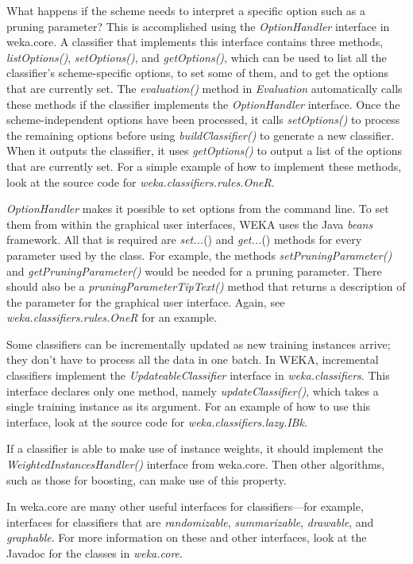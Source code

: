 What happens if the scheme needs to interpret a specific option such
as a pruning parameter? This is accomplished using
the \textit{OptionHandler} interface in weka.core. A classifier that
implements this interface contains three
methods, \textit{listOptions()}, \textit{setOptions()},
and \textit{getOptions()}, which can be used to list all the
classifier's scheme-specific options, to set some of them, and to get
the options that are currently set. The \textit{evaluation()} method
in \textit{Evaluation} automatically calls these methods if the
classifier implements the \textit{OptionHandler} interface. Once the
scheme-independent options have been processed, it
calls \textit{setOptions()} to process the remaining options before
using \textit{buildClassifier()} to generate a new classifier. When it
outputs the classifier, it uses \textit{getOptions()} to output a list
of the options that are currently set. For a simple example of how to
implement these methods, look at the source code for
\textit{weka.classifiers.rules.OneR}.

\textit{OptionHandler} makes it possible to set options from the command
line. To set them from within the graphical user interfaces, WEKA uses
the Java \textit{beans} framework. All that is required are \textit{set...}() and
\textit{get...}() methods for every parameter used by the class. For example,
the methods \textit{setPruningParameter()} and \textit{getPruningParameter()} would be
needed for a pruning parameter. There should also be a
\textit{pruningParameterTipText()} method that returns a description of the
parameter for the graphical user interface. Again, see
\textit{weka.classifiers.rules.OneR} for an example.

Some classifiers can be incrementally updated as new training
instances arrive; they don't have to process all the data in one
batch. In WEKA, incremental classifiers implement the
\textit{UpdateableClassifier} interface in \textit{weka.classifiers}. This interface
declares only one method, namely \textit{updateClassifier()}, which
takes a single training instance as its argument. For an example of
how to use this interface, look at the source code
for \textit{weka.classifiers.lazy.IBk}.

If a classifier is able to make use of instance weights, it should
implement the \textit{WeightedInstancesHandler()} interface from
weka.core. Then other algorithms, such as those for boosting, can make
use of this property.

In weka.core are many other useful interfaces for classifiers---for
example, interfaces for classifiers that are \textit{randomizable},
\textit{summarizable}, \textit{drawable}, and \textit{graphable}. 
For more information on these
and other interfaces, look at the Javadoc for the classes in
\textit{weka.core}.


